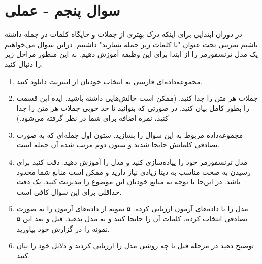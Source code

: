 \section{سوال پنجم - عملی}

در دوران ابتدایی برای اینکه درک بهتری از جملات و جایگاه کلمات در جمله داشته باشیم تمرینی تحت عنوان "با کلمات زیر جمله بسازید" داشتیم. دراین سوال می‌خواهیم یک مدل ترنسفورمر را از ابتدا برای این وظیفه آموزش دهیم. به این منظور مراحل زیر را دنبال کنید.

\begin{enumerate}
	\item مجموعه‌داده‌ای فارسی به انتخاب خودتان از اینترنت دانلود کنید.
	
	
	\item جملات هر متن را جدا کنید. (ممکن است چالش‌هایی داشته باشید. ایده این قسمت را بطور کامل بیان کنید. در صورتی که بتوانید تا حد خوبی جملات هر متن را جدا کنید، نمره اضافه برای شما در نظر گرفته می‌شود.)
	
	
	
	\item مجموعه‌داده مربوط به این سوال را بسازید. ستون اول جمله‌ای که به صورت تصادفی کلماتش جابجا شدند و ستون دوم مرتب شده آن جمله است.
	
	
	
	
	\item مدل ترنسفورمر خود را پیاده‌سازی کنید و مدل را آموزش دهید. دقت کنید برای رسیدن به صحت مناسب به دیتا زیادی نیاز دارید و ممکن است منابع شما محدود باشد. در این‌جا با توجه به منابع خودتان این موضوع را مدیریت کنید. یک دقت حداقلی برای این سوال کافی است.
	
	
	
	
	
	\item مدل را با داده‌های آزمون ارزیابی کرده. ۵ نمونه از داده‌های آزمون را به صورت تصادفی انتخاب کرده، کلمات آن را جابجا کنید و به مدل بدهید. قبل و بعد این ۵ نمونه را در گزارش خود بیاورید.
	
	
	
	
	
	\item توضیح دهید در مرحله قبل با چه روشی مدل را ارزیابی کردید و دلایل خود را بیان کنید.
\end{enumerate}









